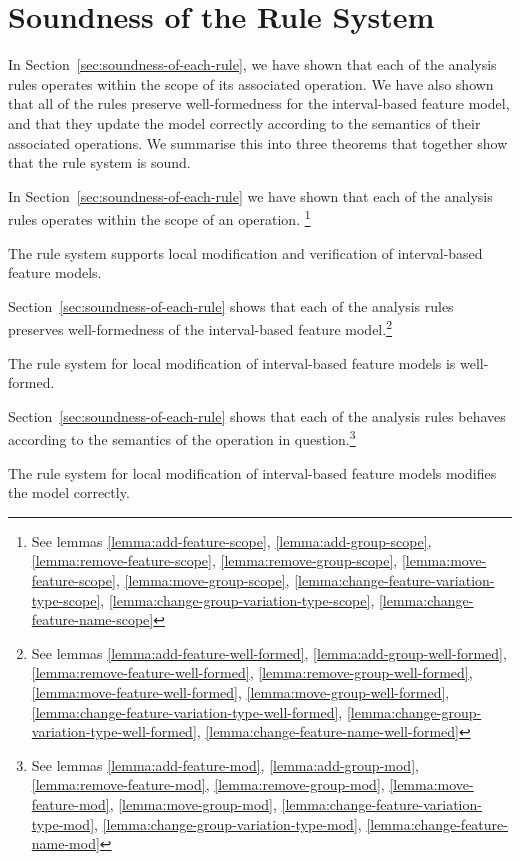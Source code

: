 \section{Soundness of the Rule System}
In Section~\vref{sec:soundness-of-each-rule}, we have shown that each of the analysis rules operates within the scope of its associated operation. We have also shown that all of the rules preserve well-formedness for the interval-based feature model, and that they update the model correctly according to the semantics of their associated operations. We summarise this into three theorems that together show that the rule system is sound.

In Section~\vref{sec:soundness-of-each-rule} we have shown that each of the analysis rules operates within the scope of an operation. \footnote{See lemmas \ref{lemma:add-feature-scope}, \ref{lemma:add-group-scope}, \ref{lemma:remove-feature-scope}, \ref{lemma:remove-group-scope}, \ref{lemma:move-feature-scope}, \ref{lemma:move-group-scope}, \ref{lemma:change-feature-variation-type-scope}, \ref{lemma:change-group-variation-type-scope}, \ref{lemma:change-feature-name-scope}}
\\
\begin{theorem}
  The rule system supports local modification and verification of interval-based feature models.
\end{theorem}

Section~\vref{sec:soundness-of-each-rule} shows that each of the analysis rules preserves well-formedness of the interval-based feature model.\footnote{See lemmas \ref{lemma:add-feature-well-formed}, \ref{lemma:add-group-well-formed}, \ref{lemma:remove-feature-well-formed}, \ref{lemma:remove-group-well-formed}, \ref{lemma:move-feature-well-formed}, \ref{lemma:move-group-well-formed}, \ref{lemma:change-feature-variation-type-well-formed}, \ref{lemma:change-group-variation-type-well-formed}, \ref{lemma:change-feature-name-well-formed}}
\\
\begin{theorem}
  The rule system for local modification of interval-based feature models is well-formed.
\end{theorem}

Section~\vref{sec:soundness-of-each-rule} shows that each of the analysis rules behaves according to the semantics of the operation in question.\footnote{See lemmas \ref{lemma:add-feature-mod}, \ref{lemma:add-group-mod}, \ref{lemma:remove-feature-mod}, \ref{lemma:remove-group-mod}, \ref{lemma:move-feature-mod}, \ref{lemma:move-group-mod}, \ref{lemma:change-feature-variation-type-mod}, \ref{lemma:change-group-variation-type-mod}, \ref{lemma:change-feature-name-mod}}
\\
\begin{theorem}
  The rule system for local modification of interval-based feature models modifies the model correctly.
\end{theorem}

